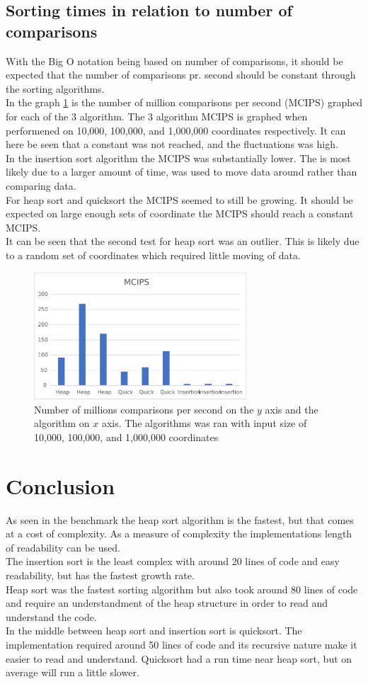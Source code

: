 \documentclass[12pt, a4paper]{article}
\begin{document}
		\subsection{Sorting times in relation to number of comparisons}
			With the Big O notation being based on number of comparisons, it should be expected that the number of comparisons pr. second should be constant through the sorting algorithms.\\	
			In the graph \ref{fig:MCIPS} is the number of million comparisons per second (MCIPS) graphed for each of the 3 algorithm. The 3 algorithm MCIPS is graphed when performened on 10,000, 100,000, and 1,000,000 coordinates respectively. It can here be seen that a constant was not reached, and the fluctuations was high.\\
			In the insertion sort algorithm the MCIPS was substantially lower. The is most likely due to a larger amount of time, was used to move data around rather than comparing data.\\
			For heap sort and quicksort the MCIPS seemed to still be growing. It should be expected on large enough sets of coordinate the MCIPS should reach a constant MCIPS.\\
			It can be seen that the second test for heap sort was an outlier. This is likely due to a random set of coordinates which required little moving of data.
			\begin{figure}[h]
				\centering
				\includegraphics[width=300px]{assets/MCIPS.eps}
				\caption{Number of millions comparisons per second on the $y$ axis and the algorithm on $x$ axis. The algorithms was ran with input size of 10,000, 100,000, and 1,000,000 coordinates }
				\label{fig:MCIPS}
			\end{figure}	
	\section{Conclusion}
	As seen in the benchmark the heap sort algorithm is the fastest, but that comes at a cost of complexity. As a measure of complexity the implementations length of readability can be used.\\
		The insertion sort is the least complex with around 20 lines of code and easy readability, but has the fastest growth rate.\\
		Heap sort was the fastest sorting algorithm but also took around 80 lines of code and require an understandment of the heap structure in order to read and understand the code.\\
		In the middle between heap sort and insertion sort is quicksort. The implementation required around 50 lines of code and its recursive nature make it easier to read and understand. Quicksort had a run time near heap sort, but on average will run a little slower.\\
\end{document}
